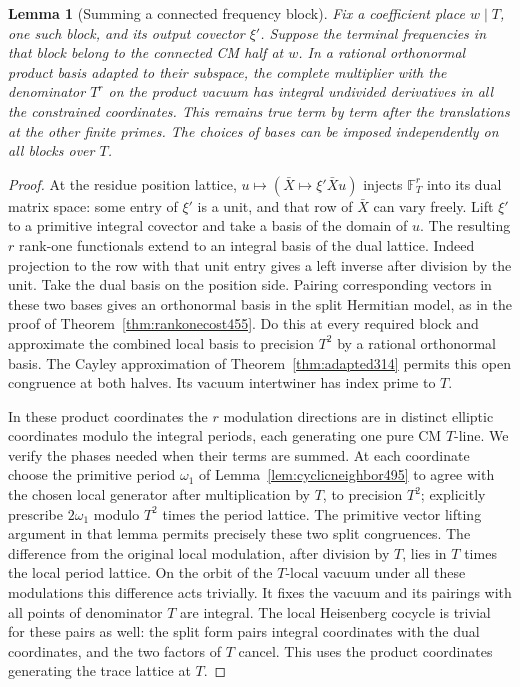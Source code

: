\documentclass[a4paper,11pt]{article}
\newtheorem{lemma}[proposition]{Lemma}
\theoremstyle{definition}
\theoremstyle{remark}
\numberwithin{equation}{section}
\begin{document}
\begin{lemma}[Summing a connected frequency block]\leavevmode
\label{lem:terminalblock496}
Fix a coefficient place \(w\mid T\), one such block, and its
output covector \(\xi'\). Suppose the terminal frequencies in
that block belong to the connected CM half at \(w\).
In a rational orthonormal product basis adapted to their
subspace, the complete multiplier with the denominator \(T^r\)
on the product vacuum has integral undivided derivatives in all
the constrained coordinates. This remains true term by term
after the translations at the other finite primes. The choices
of bases can be imposed independently on all blocks over \(T\).
\end{lemma}
\begin{proof}
At the residue position lattice, \(u\mapsto
(\bar X\mapsto\xi'\bar X u)\) injects \(\mathbb F_T^r\) into
its dual matrix space: some entry of \(\xi'\) is a unit, and
that row of \(\bar X\) can vary freely. Lift \(\xi'\) to a
primitive integral covector and take a basis of the domain
of \(u\). The resulting \(r\) rank-one functionals extend
to an integral basis of the dual lattice. Indeed projection to
the row with that unit entry gives a left inverse after division
by the unit. Take the dual basis on the position side. Pairing
corresponding vectors in these two bases gives an orthonormal
basis in the split Hermitian model, as in the proof of
Theorem~\ref{thm:rankonecost455}. Do this at every required
block and approximate the combined local basis to precision
\(T^2\) by a rational orthonormal basis. The Cayley
approximation of Theorem~\ref{thm:adapted314} permits this
open congruence at both halves. Its vacuum intertwiner has
index prime to \(T\).

In these product coordinates the \(r\) modulation directions
are in distinct elliptic coordinates modulo the integral
periods, each generating one pure CM \(T\)-line. We verify the
phases needed when their terms are summed. At each coordinate
choose the primitive period \(\omega_1\) of
Lemma~\ref{lem:cyclicneighbor495} to agree with the chosen
local generator after multiplication by \(T\), to precision
\(T^2\); explicitly prescribe \(2\omega_1\) modulo \(T^2\)
times the period lattice. The primitive vector lifting argument
in that lemma permits precisely these two split congruences.
The difference from the original local modulation, after
division by \(T\), lies in \(T\) times the local period lattice.
On the orbit of the \(T\)-local vacuum under all these modulations
this difference acts trivially. It fixes the vacuum and its
pairings with all points of denominator \(T\) are integral.
The local Heisenberg cocycle is trivial for these pairs as
well: the split form pairs integral coordinates with the dual
coordinates, and the two factors of \(T\) cancel. This uses
the product coordinates generating the trace lattice at \(T\).


\end{proof}
\end{document}
